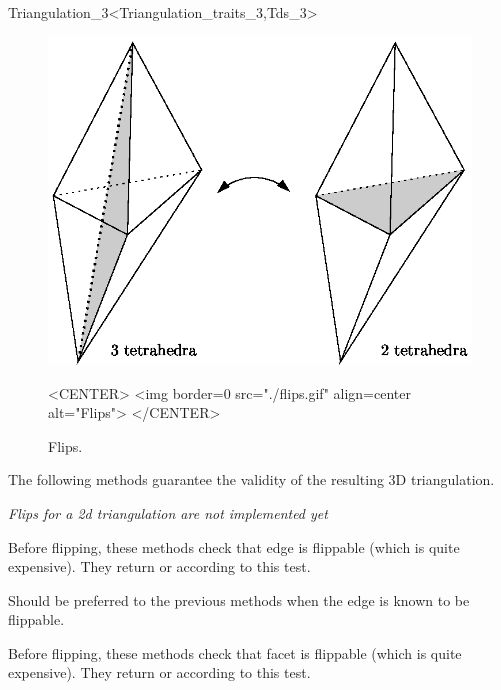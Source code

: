 \begin{ccRefClass}{Triangulation_3<Triangulation_traits_3,Tds_3>}
\begin{figure}
\begin{ccTexOnly}
\begin{center} 
\includegraphics{flips.eps}
\end{center}
\end{ccTexOnly}
\caption{Flips.
\label{Triangulation3-fig-flips}}
\begin{ccHtmlOnly}
<CENTER>
<img border=0 src="./flips.gif" align=center
alt="Flips">
</CENTER>
\end{ccHtmlOnly}
\end{figure} 

The following methods guarantee the validity of the resulting 3D
triangulation.

\textit{Flips for a 2d triangulation are not implemented yet}

\ccGlue
{}
{Before flipping, these methods check that edge  is
flippable (which is quite expensive). They return  or
 according to this test.}

\ccGlue
{}
{Should be preferred to the previous methods when the edge is
known to be flippable.
}

\ccGlue
{}
{Before flipping, these methods check that facet  is
flippable (which is quite expensive). They return  or
 according to this test.} 


\end{ccRefClass}
